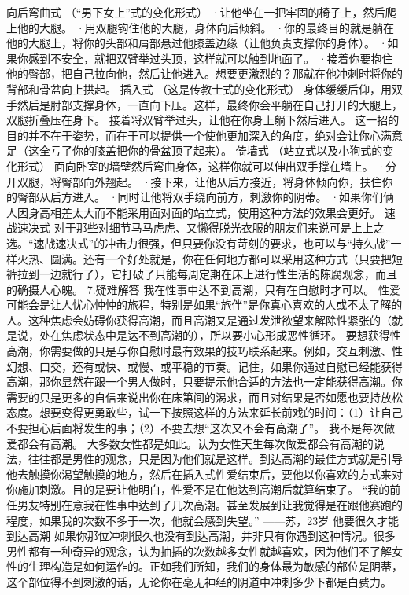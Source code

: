 \documentclass[12pt,UTF8]{ctexbook}
\begin{document}
向后弯曲式
（“男下女上”式的变化形式）
·让他坐在一把牢固的椅子上，然后爬上他的大腿。
·用双腿钩住他的大腿，身体向后倾斜。
·你的最终目的就是躺在他的大腿上，将你的头部和肩部悬过他膝盖边缘（让他负责支撑你的身体）。
·如果你感到不安全，就把双臂举过头顶，这样就可以触到地面了。
·接着你要抱住他的臀部，把自己拉向他，然后让他进入。想要更激烈的？那就在他冲刺时将你的背部和骨盆向上拱起。
插入式
（这是传教士式的变化形式）
身体缓缓后仰，用双手然后是肘部支撑身体，一直向下压。这样，最终你会平躺在自己打开的大腿上，双腿折叠压在身下。
接着将双臂举过头，让他在你身上躺下然后进入。
这一招的目的并不在于姿势，而在于可以提供一个使他更加深入的角度，绝对会让你心满意足（这全亏了你的膝盖把你的骨盆顶了起来）。
倚墙式
（站立式以及小狗式的变化形式）
面向卧室的墙壁然后弯曲身体，这样你就可以伸出双手撑在墙上。
·分开双腿，将臀部向外翘起。
·接下来，让他从后方接近，将身体倾向你，扶住你的臀部从后方进入。
·同时让他将双手绕向前方，刺激你的阴蒂。
·如果你们俩人因身高相差太大而不能采用面对面的站立式，使用这种方法的效果会更好。
速战速决式
对于那些对细节马马虎虎、又懒得脱光衣服的朋友们来说可是上上之选。“速战速决式”的冲击力很强，但只要你没有苛刻的要求，也可以与“持久战”一样火热、圆满。还有一个好处就是，你在任何地方都可以采用这种方式（只要把短裤拉到一边就行了），它打破了只能每周定期在床上进行性生活的陈腐观念，而且的确摄人心魄。
7.疑难解答
我在性事中达不到高潮，只有在自慰时才可以。
性爱可能会是让人忧心忡忡的旅程，特别是如果“旅伴”是你真心喜欢的人或不太了解的人。这种焦虑会妨碍你获得高潮，而且高潮又是通过发泄欲望来解除性紧张的（就是说，处在焦虑状态中是达不到高潮的），所以要小心形成恶性循环。
要想获得性高潮，你需要做的只是与你自慰时最有效果的技巧联系起来。例如，交互刺激、性幻想、口交，还有或快、或慢、或平稳的节奏。记住，如果你通过自慰已经能获得高潮，那你显然在跟一个男人做时，只要提示他合适的方法也一定能获得高潮。你需要的只是更多的自信来说出你在床第间的渴求，而且对结果是否如愿也要持放松态度。想要变得更勇敢些，试一下按照这样的方法来延长前戏的时间：（1）让自己不要担心后面将发生的事；（2）不要去想“这次又不会有高潮了”。
我不是每次做爱都会有高潮。
大多数女性都是如此。认为女性天生每次做爱都会有高潮的说法，往往都是男性的观念，只是因为他们就是这样。到达高潮的最佳方式就是引导他去触摸你渴望触摸的地方，然后在插入式性爱结束后，要他以你喜欢的方式来对你施加刺激。目的是要让他明白，性爱不是在他达到高潮后就算结束了。
“我的前任男友特别在意我在性事中达到了几次高潮。甚至发展到让我觉得是在跟他赛跑的程度，如果我的次数不多于一次，他就会感到失望。”
——苏，23岁
他要很久才能到达高潮
如果你那位冲刺很久也没有到达高潮，并非只有你遇到这种情况。很多男性都有一种奇异的观念，认为抽插的次数越多女性就越喜欢，因为他们不了解女性的生理构造是如何运作的。正如我们所知，我们的身体最为敏感的部位是阴蒂，这个部位得不到刺激的话，无论你在毫无神经的阴道中冲刺多少下都是白费力。
\end{document}
